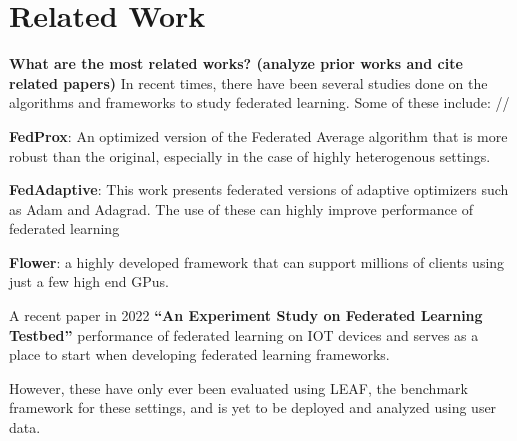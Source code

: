 \section{Related Work}
    \textbf{What are the most related works? (analyze prior works and cite related papers)}
    In recent times, there have been several studies done on the algorithms and frameworks to study federated learning. Some of these include: //

    \textbf{FedProx}: An optimized version of the Federated Average algorithm that is more robust than the original, especially in the case of highly heterogenous settings.

    \textbf{FedAdaptive}: This work presents federated versions of adaptive optimizers such as Adam and Adagrad. The use of these can highly improve performance of federated learning

    \textbf{Flower}: a highly developed framework that can support millions of clients using just a few high end GPus.

    A recent paper in 2022 \textbf{“An Experiment Study on Federated Learning Testbed”} performance of federated learning on IOT devices and serves as a place to start when developing federated learning frameworks.

    However, these have only ever been evaluated using LEAF, the benchmark framework for these settings, and is yet to be deployed and analyzed using user data.


